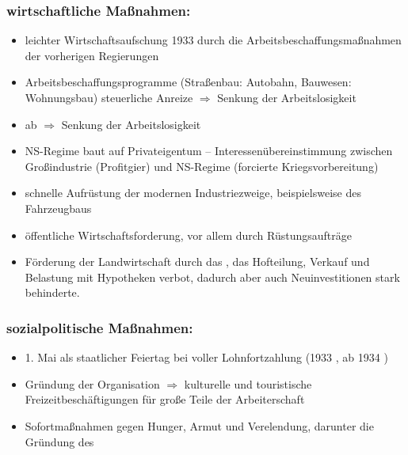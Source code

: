 \subsubsection{wirtschaftliche Maßnahmen:}

\begin{itemize}
\item leichter Wirtschaftsaufschung 1933 durch die
Arbeitsbeschaffungsmaßnahmen der vorherigen Regierungen
\item Arbeitsbeschaffungsprogramme (Straßenbau: Autobahn, Bauwesen:
Wohnungsbau) steuerliche Anreize $\Rightarrow$ Senkung der
Arbeitslosigkeit
\item ab  $\Rightarrow$
Senkung der Arbeitslosigkeit
\item NS-Regime baut auf Privateigentum -- Interessenübereinstimmung
zwischen Großindustrie (Profitgier) und NS-Regime (forcierte
Kriegsvorbereitung)
\item schnelle Aufrüstung der modernen Industriezweige, beispielsweise
des Fahrzeugbaus
\item öffentliche Wirtschaftsforderung, vor allem durch
Rüstungsaufträge
\item Förderung der Landwirtschaft durch das
, das 
Hofteilung, Verkauf und Belastung mit Hypotheken verbot, dadurch aber
auch Neuinvestitionen stark behinderte.
\end{itemize}

\subsubsection{sozialpolitische Maßnahmen:}

\begin{itemize}
\item 1. Mai als staatlicher Feiertag bei voller Lohnfortzahlung
(1933 , ab 1934 ) 
\item Gründung der Organisation  $\Rightarrow$ kulturelle und touristische
Freizeitbeschäftigungen für große Teile der Arbeiterschaft
\item Sofortmaßnahmen gegen Hunger, Armut und Verelendung, darunter
die Gründung des 
\end{itemize}

\endinput
